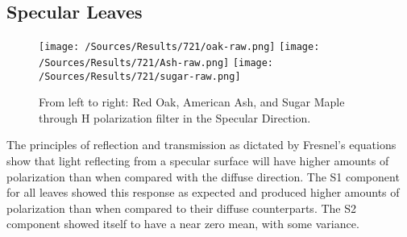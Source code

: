 \subsection{Specular Leaves}
%
\begin{figure}[htp]
    \centering
    \texttt{[image: /Sources/Results/721/oak-raw.png]}\hfill
    \texttt{[image: /Sources/Results/721/Ash-raw.png]}\hfill
    \texttt{[image: /Sources/Results/721/sugar-raw.png]}

    \caption{From left to right: Red Oak, American Ash, and Sugar Maple through H polarization filter in the Specular Direction.}
    \label{fig:specular-raw}
\end{figure}
%
The principles of reflection and transmission as dictated by Fresnel’s equations show that light reflecting from a specular surface will have higher amounts of polarization than when compared with the diffuse direction.  The S1 component for all leaves showed this response as expected and produced higher amounts of polarization than when compared to their diffuse counterparts.  The S2 component showed itself to have a near zero mean, with some variance.

